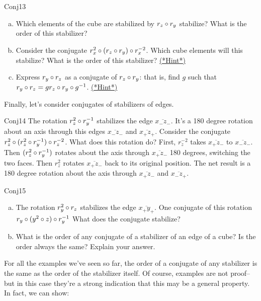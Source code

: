 \begin{exercise}{Conj13}
\begin{enumerate}[(a)]
\item Which elements of the cube are stabilized by $r_z\circ r_y$ stabilize?  What is the order of this stabilizer?  
\item Consider the conjugate $r_x^{2}\circ (r_z\circ r_y)\circ r_x^{-2}$.  Which cube elements will this stabilize?  What is the order of this stabilizer?
\hyperref[sec:actions:hints]{(*Hint*)}
\item Express  $r_y\circ r_z$ as a conjugate of $r_z\circ r_y$: that is, find $g$ such that 
$r_y\circ r_z = g r_z\circ r_y \circ g^{-1}$. 
\hyperref[sec:actions:hints]{(*Hint*)}
\end {enumerate}	
\end {exercise}

Finally, let's consider  conjugates of stabilizers of edges.

\begin{example}{Conj14}
The rotation $r_z^2\circ r_y^{-1}$ stabilizes the edge $\overline{x_- z_-}$.  It's a 180 degree rotation about an axis through this edges  $\overline{x_- z_-}$ and $\overline{x_+z_+}$. Consider the conjugate   $r_z^{2}\circ (r_z^2\circ r_y^{-1})\circ r_z^{-2}$.  What does this rotation do?  First,  $r_z^{-2}$ takes $\overline{x_+z_-}$ to $\overline{x_-z_-}$.  Then $(r_z^2\circ r_y^{-1})$ rotates about the axis through $\overline{x_+z_-}$ 180 degrees, switching the two faces. Then $r_z^2$ rotates $\overline{x_+z_-}$ back to its original position.  The net result is a 180 degree rotation about the axis through $\overline{x_+z_-}$ and $\overline{x_-z_+}$.
\end{example}

\begin{exercise}{Conj15}
\begin{enumerate}[(a)]
\item The rotation $r_y^2\circ r_z$ stabilizes the edge $\overline{x_+y_+}$. One conjugate of this rotation $r_y\circ (y^2\circ z)\circ r_y^{-1}$ What does the conjugate stabilize?
\item What is the order of any conjugate of a stabilizer of an edge of a cube? Is the  order always the same?  Explain your answer.
\end {enumerate}
\end{exercise}

For all the examples we've seen so far, the order of a conjugate of any stabilizer is the same as the order of the stabilizer itself. Of course, examples are not proof--but in this case they're a strong indication that this may be a general property. In fact, we can show: 

